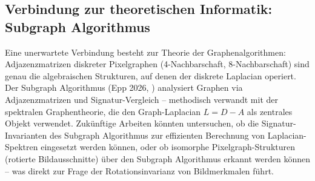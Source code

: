 ﻿\documentclass[a4paper,12pt]{article}
\theoremstyle{definition}
\begin{document}
\subsection{Verbindung zur theoretischen Informatik: Subgraph Algorithmus}

Eine unerwartete Verbindung besteht zur Theorie der Graphenalgorithmen: Adjazenzmatrizen
diskreter Pixelgraphen (4-Nachbarschaft, 8-Nachbarschaft) sind genau die algebraischen Strukturen,
auf denen der diskrete Laplacian operiert. Der Subgraph Algorithmus (Epp 2026, \cite{epp2026})
analysiert Graphen via Adjazenzmatrizen und Signatur-Vergleich -- methodisch verwandt mit der
spektralen Graphentheorie, die den Graph-Laplacian $L = D - A$ als zentrales Objekt verwendet.
Zukünftige Arbeiten könnten untersuchen, ob die Signatur-Invarianten des Subgraph Algorithmus
zur effizienten Berechnung von Laplacian-Spektren eingesetzt werden können, oder ob isomorphe
Pixelgraph-Strukturen (rotierte Bildausschnitte) über den Subgraph Algorithmus erkannt werden
können -- was direkt zur Frage der Rotationsinvarianz von Bildmerkmalen führt.
\end{document}
